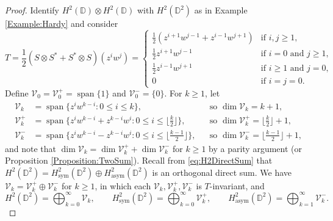 \documentclass[10pt,reqno]{amsart}
\newcommand{\0}{{\color{lightgray}0}}
\newcommand{\D}{\mathbb{D}}
\renewcommand{\leq}{\leqslant}
\renewcommand{\geq}{\geqslant}
\newcommand{\V}{\mathcal{V}}
\theoremstyle{definition}
\numberwithin{equation}{section}
\begin{document}
\begin{proof}
Identify $H^2(\D) \otimes H^2(\D)$ with $H^2(\D^2)$ as in Example \ref{Example:Hardy} and consider
\begin{equation*}
T = \frac{1}{2}(S\otimes S^*+S^* \otimes S)(z^i   w^j)
=
\begin{cases}
\frac{1}{2}(z^{i+1}   w^{j-1}+z^{i-1}   w^{j+1}) & \text{if $i,j \geq 1$},\\[2pt]
\frac{1}{2}z^{i+1}   w^{j-1} & \text{if $i = 0$ and $j \geq 1$},\\[2pt]
\frac{1}{2}z^{i-1}   w^{j+1} & \text{if $i \geq1$ and $j =0$},\\[2pt]
0 & \text{if $i=j=0$}.
\end{cases}
\end{equation*}
Define $\V_0 = \V_0^+ = \operatorname{span}\{1\}$ and $\V_0^- = \{ 0\}$.
For $k\geq 1$, let
\begin{align*}
\V_k &= \operatorname{span}\{ z^i w^{k-i} : 0 \leq i \leq k\}, && \text{so $\dim \V_k = k+1$}, \\
\V_{k}^+  &= \operatorname{span}\{z^i w^{k-i} + z^{k-i} w^i: 0 \leq i \leq {\lfloor \tfrac{k}{2}\rfloor}\}, && \text{so $\dim \V_k^+ = \lfloor \tfrac{k}{2} \rfloor + 1$},\\
\V_{k}^- &= \operatorname{span}\{ z^i w^{k-i} - z^{k-i}w^i : 0 \leq i \leq {\lfloor \tfrac{k-1}{2}\rfloor}\}, && \text{so $\dim \V_k^- = \lfloor \tfrac{k-1}{2}\rfloor+1$},
\end{align*}
and note that 
$\dim \V_k =   \dim \V_k^+ + \dim \V_k^-$ for $k\geq 1$
by a parity argument (or Proposition \ref{Proposition:TwoSum}).  Recall from \eqref{eq:H2DirectSum} that
$H^2(\D^2) = H^2_{\operatorname{sym}}(\D^2) \oplus H^2_{\operatorname{asym}}(\D^2)$ is an orthogonal direct sum.
We have $\V_k = \V_k^+ \oplus \V_k^-$ for $k \geq 1$,
in which each $\V_k, \V_{k}^+ , \V_{k}^- $ is $T$-invariant, and
\begin{equation}\label{Eq:directsumspaces}
    H^2(\D^2) = \bigoplus_{k=0}^{\infty} \V_k, \qquad H^2_{\operatorname{sym}}(\D^2) = \bigoplus_{k=0}^{\infty} \V_{k}^+ , \qquad 
    H^2_{\operatorname{asym}}(\D^2) = \bigoplus_{k=1}^{\infty} \V_{k}^- .
\end{equation} 


\end{proof}
\end{document}
